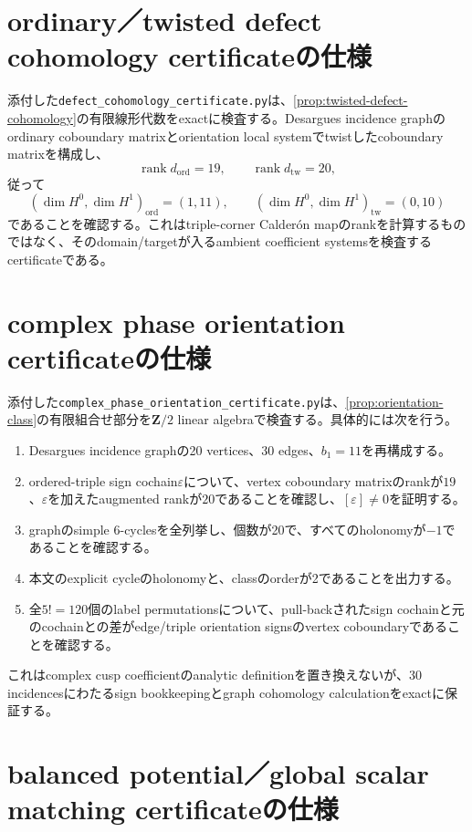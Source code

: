 \documentclass[11pt,a4paper]{ltjsarticle}
\theoremstyle{definition}
\theoremstyle{remark}
\newcommand{\ZZ}{\mathbf Z}
\begin{document}
\section{ordinary／twisted defect cohomology certificateの仕様}

添付した\texttt{defect\_cohomology\_certificate.py}は、\cref{prop:twisted-defect-cohomology}の有限線形代数をexactに検査する。Desargues incidence graphのordinary coboundary matrixとorientation local systemでtwistしたcoboundary matrixを構成し、
\[
 \operatorname{rank}d_{\mathrm{ord}}=19,
 \qquad
 \operatorname{rank}d_{\mathrm{tw}}=20,
\]
従って
\[
 (\dim H^0,\dim H^1)_{\mathrm{ord}}=(1,11),
 \qquad
 (\dim H^0,\dim H^1)_{\mathrm{tw}}=(0,10)
\]
であることを確認する。これはtriple-corner Calder\'on mapのrankを計算するものではなく、そのdomain/targetが入るambient coefficient systemsを検査するcertificateである。

\section{complex phase orientation certificateの仕様}

添付した\texttt{complex\_phase\_orientation\_certificate.py}は、\cref{prop:orientation-class}の有限組合せ部分を$\ZZ/2$ linear algebraで検査する。具体的には次を行う。
\begin{enumerate}[leftmargin=2.5em]
\item Desargues incidence graphの20 vertices、30 edges、$b_1=11$を再構成する。
\item ordered-triple sign cochain$\varepsilon$について、vertex coboundary matrixのrankが$19$、$\varepsilon$を加えたaugmented rankが$20$であることを確認し、$[\varepsilon]\ne0$を証明する。
\item graphのsimple $6$-cyclesを全列挙し、個数が20で、すべてのholonomyが$-1$であることを確認する。
\item 本文のexplicit cycleのholonomyと、classのorderが2であることを出力する。
\item 全$5!=120$個のlabel permutationsについて、pull-backされたsign cochainと元のcochainとの差がedge/triple orientation signsのvertex coboundaryであることを確認する。
\end{enumerate}
これはcomplex cusp coefficientのanalytic definitionを置き換えないが、30 incidencesにわたるsign bookkeepingとgraph cohomology calculationをexactに保証する。

\section{balanced potential／global scalar matching certificateの仕様}
\end{document}
